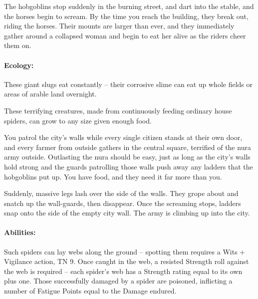 \begin{multicols}{2}
\begin{boxtext}

	The hobgoblins stop suddenly in the burning street, and dart into the stable, and the horses begin to scream.
	By the time you reach the building, they break out, riding the horses.
	Their mounts are larger than ever, and they immediately gather around a collapsed woman and begin to eat her alive as the riders cheer them on.

\end{boxtext}

\label{nura_slug}

\paragraph{Ecology:} These giant slugs eat constantly -- their corrosive slime can eat up whole fields or areas of arable land overnight.


\label{nura_spider}

These terrifying creatures, made from continuously feeding ordinary house spiders, can grow to any size given enough food.

\begin{boxtext}

	You patrol the city's walls while every single citizen stands at their own door, and every farmer from outside gathers in the central square, terrified of the nura army outside.
	Outlasting the nura should be easy, just as long as the city's walls hold strong and the guards patrolling those walls push away any ladders that the hobgoblins put up.
	You have food, and they need it far more than you.

	Suddenly, massive legs lash over the side of the walls.
	They grope about and snatch up the wall-guards, then disappear.
	Once the screaming stops, ladders snap onto the side of the empty city wall.
	The army is climbing up into the city.

\end{boxtext}

\nuraspider

\paragraph{Abilities:} Such spiders can lay webs along the ground -- spotting them requires a Wits + Vigilance action, TN 9.
Once caught in the web, a resisted Strength roll against the web is required -- each spider's web has a Strength rating equal to its own plus one.
Those successfully damaged by a spider are poisoned, inflicting a number of Fatigue Points equal to the Damage endured.


\end{multicols}
